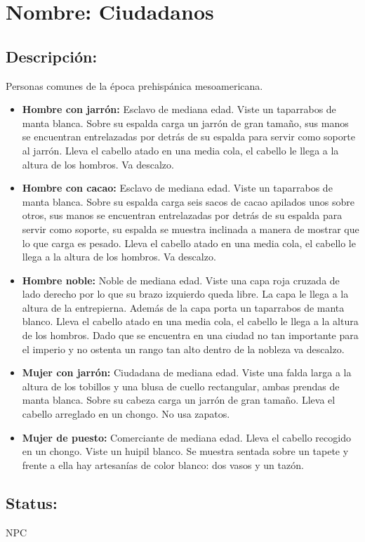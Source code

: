 \section{Nombre: Ciudadanos} \label{per:ciudadanos}  
\subsection{Descripción:}
Personas comunes de la época prehispánica mesoamericana.
\begin{itemize}
	\item \textbf{Hombre con jarrón:}
	Esclavo de mediana  edad. Viste un taparrabos de manta blanca. Sobre su espalda carga un jarrón de gran tamaño, sus manos se encuentran entrelazadas por detrás de su espalda para servir como soporte al jarrón. Lleva el cabello atado en una media cola, el cabello le llega a la altura de los hombros. Va descalzo.
	\item \textbf{Hombre con cacao:}
	Esclavo de mediana edad. Viste un taparrabos de manta blanca. Sobre su espalda carga seis sacos de cacao apilados unos sobre otros, sus manos se encuentran entrelazadas por detrás de su espalda para servir como soporte, su espalda se muestra inclinada a manera de mostrar que lo que carga es pesado. Lleva el cabello atado en una media cola, el cabello le llega a la altura de los hombros. Va descalzo.	
\item \textbf{Hombre noble:}
	Noble de mediana edad. Viste una capa roja cruzada de lado derecho por lo que su brazo izquierdo queda libre. La capa le llega a la altura de la entrepierna. Además de la capa porta un taparrabos de manta blanco. Lleva el cabello atado en una media cola, el cabello le llega a la altura de los hombros. Dado que se encuentra en una ciudad no tan importante para el imperio y no ostenta un rango tan alto dentro de la nobleza va descalzo.
	\item \textbf{Mujer con jarrón:}
	Ciudadana de mediana edad. Viste una falda larga a la altura de los tobillos y una blusa de cuello rectangular, ambas prendas de manta blanca. Sobre su cabeza carga un jarrón de gran tamaño. Lleva el cabello arreglado en un chongo. No usa zapatos.
	\item \textbf{Mujer de puesto:}
	Comerciante de mediana edad. Lleva el cabello recogido en un chongo. Viste un huipil blanco. Se muestra sentada sobre  un tapete y frente a ella hay artesanías de color blanco: dos vasos y un tazón.	
	\end{itemize} 
\subsection{Status:}
NPC
